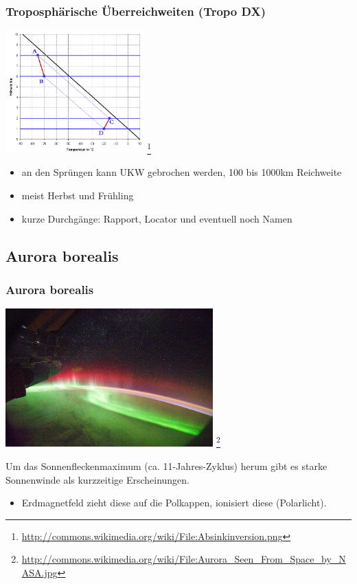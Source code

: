\begin{frame}
    \frametitle{Troposphärische Überreichweiten (Tropo DX)}

    \begin{center}
        \includegraphics[width=0.4\textwidth,height=.5\textheight,keepaspectratio]{bv11/Absinkinversion.png}
        \footnote{\tiny \url{http://commons.wikimedia.org/wiki/File:Absinkinversion.png}}
    \end{center}

    \begin{itemize}
        \item an den Sprüngen kann UKW gebrochen werden, 100 bis 1000km Reichweite
        \item meist Herbst und Frühling
        \item kurze Durchgänge: Rapport, Locator und eventuell noch Namen
    \end{itemize}

\end{frame}

\subsection{Aurora borealis}

\begin{frame}
    \frametitle{Aurora borealis}

    \begin{center}
        \includegraphics[width=0.6\textwidth,height=.5\textheight,keepaspectratio]{bv11/Aurora_Seen_From_Space_by_NASA.jpg}
        \footnote{\tiny \url{http://commons.wikimedia.org/wiki/File:Aurora_Seen_From_Space_by_NASA.jpg}}
    \end{center}

    Um das Sonnenfleckenmaximum (ca. 11-Jahres-Zyklus) herum gibt es starke
    Sonnenwinde als kurzzeitige Erscheinungen.

    \begin{itemize}
        \item Erdmagnetfeld zieht diese auf die Polkappen, ionisiert diese (Polarlicht).
    \end{itemize}

\end{frame}

